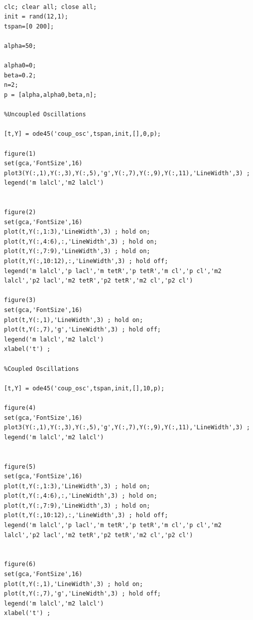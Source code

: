 \documentclass[a4paper]{article}
\begin{document}
\begin{lstlisting}[style=MyMatlabstyle]
%Repressilator

clc; clear all; close all;
init = rand(12,1);
tspan=[0 200];

alpha=50;

alpha0=0;
beta=0.2;
n=2;
p = [alpha,alpha0,beta,n];

%Uncoupled Oscillations

[t,Y] = ode45('coup_osc',tspan,init,[],0,p);

figure(1)
set(gca,'FontSize',16)
plot3(Y(:,1),Y(:,3),Y(:,5),'g',Y(:,7),Y(:,9),Y(:,11),'LineWidth',3) ; 
legend('m lalcl','m2 lalcl')


figure(2)
set(gca,'FontSize',16)
plot(t,Y(:,1:3),'LineWidth',3) ; hold on;
plot(t,Y(:,4:6),:,'LineWidth',3) ; hold on;
plot(t,Y(:,7:9),'LineWidth',3) ; hold on;
plot(t,Y(:,10:12),:,'LineWidth',3) ; hold off;
legend('m lalcl','p lacl','m tetR','p tetR','m cl','p cl','m2 lalcl','p2 lacl','m2 tetR','p2 tetR','m2 cl','p2 cl')

figure(3)
set(gca,'FontSize',16)
plot(t,Y(:,1),'LineWidth',3) ; hold on;
plot(t,Y(:,7),'g','LineWidth',3) ; hold off;
legend('m lalcl','m2 lalcl')
xlabel('t') ; 

%Coupled Oscillations

[t,Y] = ode45('coup_osc',tspan,init,[],10,p);

figure(4)
set(gca,'FontSize',16)
plot3(Y(:,1),Y(:,3),Y(:,5),'g',Y(:,7),Y(:,9),Y(:,11),'LineWidth',3) ; 
legend('m lalcl','m2 lalcl')


figure(5)
set(gca,'FontSize',16)
plot(t,Y(:,1:3),'LineWidth',3) ; hold on;
plot(t,Y(:,4:6),:,'LineWidth',3) ; hold on;
plot(t,Y(:,7:9),'LineWidth',3) ; hold on;
plot(t,Y(:,10:12),:,'LineWidth',3) ; hold off;
legend('m lalcl','p lacl','m tetR','p tetR','m cl','p cl','m2 lalcl','p2 lacl','m2 tetR','p2 tetR','m2 cl','p2 cl')


figure(6)
set(gca,'FontSize',16)
plot(t,Y(:,1),'LineWidth',3) ; hold on;
plot(t,Y(:,7),'g','LineWidth',3) ; hold off;
legend('m lalcl','m2 lalcl')
xlabel('t') ; 
\end{lstlisting}
\end{document}
